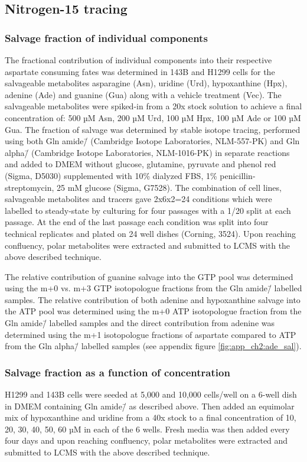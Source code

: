 \subsection{Nitrogen-15 tracing}

\subsubsection{Salvage fraction of individual components}
The fractional contribution of individual components into their respective aspartate consuming fates was determined in 143B and H1299 cells for the salvageable metabolites asparagine (Asn), uridine (Urd), hypoxanthine (Hpx), adenine (Ade) and guanine (Gua) along with a vehicle treatment (Vec).
The salvageable metabolites were spiked-in from a 20x stock solution to achieve a final concentration of: 500 µM Asn, 200 µM Urd, 100 µM Hpx, 100 µM Ade or 100 µM Gua.
The fraction of salvage was determined by stable isotope tracing, performed using both Gln amide\=/\hNi{} (Cambridge Isotope Laboratories, NLM-557-PK) and Gln alpha\=/\hNi{} (Cambridge Isotope Laboratories, NLM-1016-PK) in separate reactions and added to DMEM without glucose, glutamine, pyruvate and phenol red (Sigma, D5030) supplemented with 10\% dialyzed FBS, 1\% penicillin-streptomycin, 25 mM glucose (Sigma, G7528).
The combination of cell lines, salvageable metabolites and tracers gave 2x6x2=24 conditions which were labelled to steady-state by culturing for four passages with a 1/20 split at each passage.
At the end of the last passage each condition was split into four technical replicates and plated on 24 well dishes (Corning, 3524).
Upon reaching confluency, polar metabolites were extracted and submitted to LCMS with the above described technique.

The relative contribution of guanine salvage into the GTP pool was determined using the m+0 vs. m+3 GTP isotopologue fractions from the Gln amide\=/\hNi{} labelled samples.
The relative contribution of both adenine and hypoxanthine salvage into the ATP pool was determined using the m+0 ATP isotopologue fraction from the Gln amide\=/\hNi{} labelled samples and the direct contribution from adenine was determined using the m+1 isotopologue fractions of aspartate compared to ATP from the Gln alpha\=/\hNi{} labelled samples (see appendix figure \ref{fig:app_ch2:ade_sal}).


\subsubsection{Salvage fraction as a function of concentration}
H1299 and 143B cells were seeded at 5,000 and 10,000 cells/well on a 6-well dish in DMEM containing Gln amide\=/\hNi{} as described above.
Then added an equimolar mix of hypoxanthine and uridine from a 40x stock to a final concentration of 10, 20, 30, 40, 50, 60 µM in each of the 6 wells.
Fresh media was then added every four days and upon reaching confluency, polar metabolites were extracted and submitted to LCMS with the above described technique.


